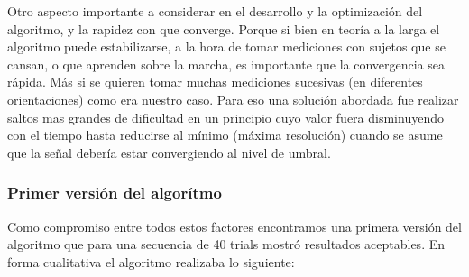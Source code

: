 \documentclass{article}
\begin{document}
    Otro aspecto importante a considerar en el desarrollo y la optimización del algoritmo, y la rapidez con que converge. Porque si bien en teoría a la larga el algoritmo puede estabilizarse, a la hora de tomar mediciones con sujetos que se cansan, o que aprenden sobre la marcha, es importante que la convergencia sea rápida. Más si se quieren tomar muchas mediciones sucesivas (en diferentes orientaciones) como era nuestro caso. Para eso una solución abordada fue realizar saltos mas grandes de dificultad en un principio cuyo valor fuera disminuyendo con el tiempo hasta reducirse al mínimo (máxima resolución) cuando se asume que la señal debería estar convergiendo al nivel de umbral. 
    
    \subsubsection{Primer versión del algorítmo} \label{staircase1}
    
    Como compromiso entre todos estos factores encontramos una primera versión del algoritmo que para una secuencia de 40 trials mostró resultados aceptables. En forma cualitativa el algoritmo realizaba lo siguiente:
    
\end{document}
